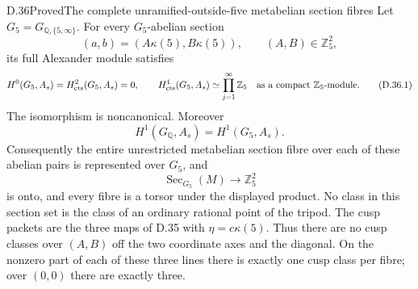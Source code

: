 \begin{statement}{D.36}{Proved}{The complete unramified-outside-five metabelian section fibres}
Let \(G_5=G_{\mathbb Q,\{5,\infty\}}\).
For every \(G_5\)-abelian section
\[
            (a,b)=(A\kappa(5),B\kappa(5)),
                  \qquad (A,B)\in\mathbb Z_5^2,
\]
its full Alexander module satisfies
\[
 H^0(G_5,A_s)=H^2_{\rm cts}(G_5,A_s)=0,\qquad
 H^1_{\rm cts}(G_5,A_s)
       \simeq\prod_{j=1}^{\infty}\mathbb Z_5
       \quad\text{as a compact }\mathbb Z_5\text{-module}.
                                                        \tag{D.36.1}
\]
The isomorphism is noncanonical. Moreover
\[
       H^1(G_{\mathbb Q},A_s)=H^1(G_5,A_s).
\]
Consequently the entire unrestricted
metabelian section fibre over each of
these abelian pairs is represented over
\(G_5\), and
\[
       \operatorname{Sec}_{G_5}(M)
                  \longrightarrow\mathbb Z_5^2
                                                        \tag{D.36.2}
\]
is onto, and every fibre is a torsor under
the displayed product. No class in this
section set is the class of an ordinary
rational point of the tripod.
The cusp packets are the three maps of
D.35 with \(\eta=c\kappa(5)\).
Thus there are no cusp classes over
\((A,B)\) off the two coordinate axes
and the diagonal. On the nonzero part
of each of these three lines there
is exactly one cusp class per fibre;
over \((0,0)\) there are exactly three.
\end{statement}
